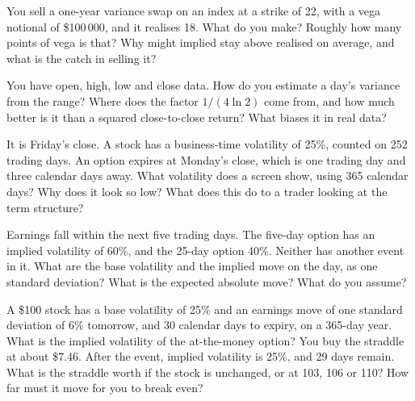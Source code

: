 \begin{question}\label{iq:iv2:vol-surface-and-vol-trading:15}
You sell a one-year variance swap on an index at a strike of 22, with a vega notional of \$100\,000, and it realises 18. What do you make? Roughly how many points of vega is that? Why might implied stay above realised on average, and what is the catch in selling it?
\end{question}

\begin{question}\label{iq:iv2:vol-surface-and-vol-trading:16}
You have open, high, low and close data. How do you estimate a day's variance from the range? Where does the factor $1/(4\ln 2)$ come from, and how much better is it than a squared close-to-close return? What biases it in real data?
\end{question}

\begin{question}\label{iq:iv2:vol-surface-and-vol-trading:17}
It is Friday's close. A stock has a business-time volatility of 25\%, counted on 252 trading days. An option expires at Monday's close, which is one trading day and three calendar days away. What volatility does a screen show, using 365 calendar days? Why does it look so low? What does this do to a trader looking at the term structure?
\end{question}

\begin{question}\label{iq:iv2:vol-surface-and-vol-trading:18}
Earnings fall within the next five trading days. The five-day option has an implied volatility of 60\%, and the 25-day option 40\%. Neither has another event in it. What are the base volatility and the implied move on the day, as one standard deviation? What is the expected absolute move? What do you assume?
\end{question}

\begin{question}\label{iq:iv2:vol-surface-and-vol-trading:19}
A \$100 stock has a base volatility of 25\% and an earnings move of one standard deviation of 6\% tomorrow, and 30 calendar days to expiry, on a 365-day year. What is the implied volatility of the at-the-money option? You buy the straddle at about \$7.46. After the event, implied volatility is 25\%, and 29 days remain. What is the straddle worth if the stock is unchanged, or at 103, 106 or 110? How far must it move for you to break even?
\end{question}


